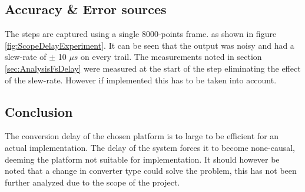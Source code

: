 \subsection{Accuracy \& Error sources}

The steps are captured using a single 8000-points frame. as shown in figure \ref{fig:ScopeDelayExperiment}. It can be seen that the output was noisy and had a slew-rate of $\pm$ 10 $\mu s$ on every trail. The measurements noted in section \ref{sec:AnalysisFsDelay} were measured at the start of the step eliminating the effect of the slew-rate. However if implemented this has to be taken into account.

\subsection{Conclusion}

The conversion delay of the chosen platform is to large to be efficient for an actual implementation. The delay of the system forces it to become none-causal, deeming the platform not suitable for implementation. It should however be noted that a change in converter type could solve the problem, this has not been further analyzed due to the scope of the project.



